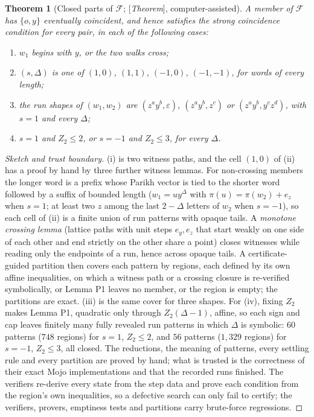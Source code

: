 \documentclass[11pt]{amsart}
\theoremstyle{plain}
\newtheorem{theorem}{Theorem}[section]
\theoremstyle{definition}
\theoremstyle{remark}
\newcommand{\Status}[1]{\textup{[\textit{#1}]}}
\begin{document}
\begin{theorem}[Closed parts of $\mathcal F$; \Status{Theorem}, computer-assisted]\label{thm:K-cells}
A member of $\mathcal F$ has $\{o,y\}$ eventually coincident, and hence satisfies the strong coincidence condition for every pair, in each of the following cases:
\begin{enumerate}[label=\textup{(\roman*)},leftmargin=*]
\item $w_1$ begins with $y$, or the two walks cross;
\item $(s,\Delta)$ is one of $(1,0)$, $(1,1)$, $(-1,0)$, $(-1,-1)$, for words of every length;
\item the run shapes of $(w_1,w_2)$ are $(z^ay^b,\varepsilon)$, $(z^ay^b,z^c)$ or $(z^ay^b,y^cz^d)$, with $s=1$ and every $\Delta$;
\item $s=1$ and $Z_2\le2$, or $s=-1$ and $Z_2\le3$, for every $\Delta$.
\end{enumerate}
\end{theorem}
\begin{proof}[Sketch and trust boundary]
(i) is two witness paths, and the cell $(1,0)$ of (ii) has a proof by hand by three further witness lemmas. For non-crossing members the longer word is a prefix whose Parikh vector is tied to the shorter word followed by a suffix of bounded length ($w_1=uy^{\Delta}$ with $\pi(u)=\pi(w_2)+e_z$ when $s=1$; at least two $z$ among the last $2-\Delta$ letters of $w_2$ when $s=-1$), so each cell of (ii) is a finite union of run patterns with opaque tails. A \emph{monotone crossing lemma} (lattice paths with unit steps $e_y,e_z$ that start weakly on one side of each other and end strictly on the other share a point) closes witnesses while reading only the endpoints of a run, hence across opaque tails. A certificate-guided partition then covers each pattern by regions, each defined by its own affine inequalities, on which a witness path or a crossing closure is re-verified symbolically, or Lemma P1 leaves no member, or the region is empty; the partitions are exact. (iii) is the same cover for three shapes. For (iv), fixing $Z_2$ makes Lemma P1, quadratic only through $Z_2(\Delta-1)$, affine, so each sign and cap leaves finitely many fully revealed run patterns in which $\Delta$ is symbolic: $60$ patterns ($748$ regions) for $s=1$, $Z_2\le2$, and $56$ patterns ($1{,}329$ regions) for $s=-1$, $Z_2\le3$, all closed. The reductions, the meaning of patterns, every settling rule and every partition are proved by hand; what is trusted is the correctness of their exact Mojo implementations and that the recorded runs finished. The verifiers re-derive every state from the step data and prove each condition from the region's own inequalities, so a defective search can only fail to certify; the verifiers, provers, emptiness tests and partitions carry brute-force regressions.
\end{proof}
\end{document}
